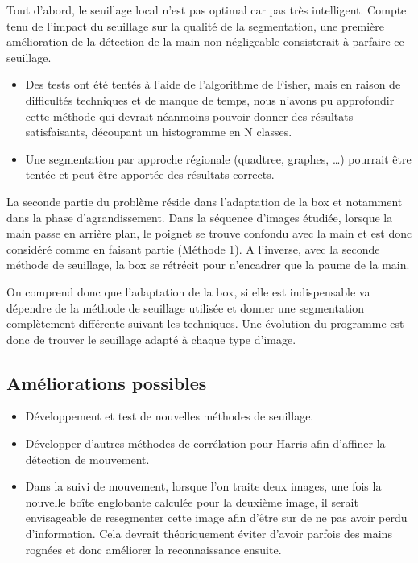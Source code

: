 Tout d’abord, le seuillage local n’est pas optimal car pas très intelligent. Compte tenu de l’impact du seuillage sur la qualité de la segmentation, une première amélioration de la détection de la main non négligeable consisterait à parfaire ce seuillage.
\begin{itemize}
\item Des tests ont été tentés à l’aide de l’algorithme de Fisher, mais en raison de difficultés techniques et de manque de temps, nous n’avons pu approfondir cette méthode qui devrait néanmoins pouvoir donner des résultats satisfaisants, découpant un histogramme en N classes.
\item Une segmentation par approche régionale (quadtree, graphes, …) pourrait être tentée et peut-être apportée des résultats corrects.
\end{itemize}

La seconde partie du problème réside dans l’adaptation de la box et notamment dans la phase d’agrandissement. Dans la séquence d’images étudiée, lorsque la main passe en arrière plan, le poignet se trouve confondu avec la main et est donc considéré comme en faisant partie (Méthode 1). A l’inverse, avec la seconde méthode de seuillage, la box se rétrécit pour n’encadrer que la paume de la main.

On comprend donc que l’adaptation de la box, si elle est indispensable va dépendre de la méthode de seuillage utilisée et donner une segmentation complètement différente suivant les techniques.
Une évolution du programme est donc de trouver le seuillage adapté à chaque type d’image.

\subsection{Améliorations possibles}
\begin{itemize}
\item Développement et test de nouvelles méthodes de seuillage.
\item Développer d’autres méthodes de corrélation pour Harris afin d’affiner la détection de mouvement.
\item Dans la suivi de mouvement, lorsque l’on traite deux images, une fois la nouvelle boîte englobante calculée pour la deuxième image, il serait envisageable de resegmenter cette image afin d’être sur de ne pas avoir perdu d’information. Cela devrait théoriquement éviter d’avoir parfois des mains rognées et donc améliorer la reconnaissance ensuite.
\end{itemize}